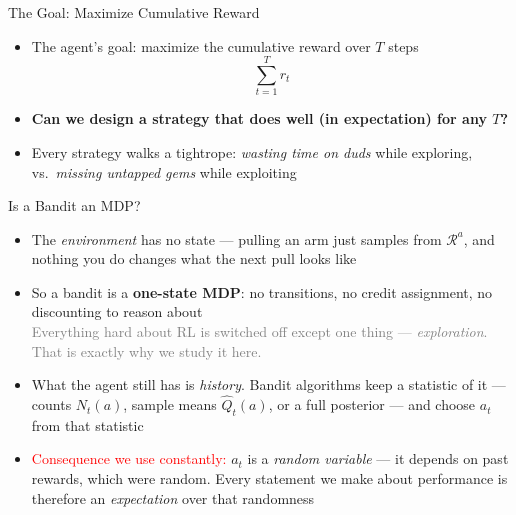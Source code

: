 \begin{frame}{The Goal: Maximize Cumulative Reward}
\begin{itemize}
    \setlength{\itemsep}{0.6em}
    \item The agent's goal: maximize the cumulative reward over $T$ steps
    \[
        \sum_{t=1}^{T} r_t
    \]
    \item \textbf{Can we design a strategy that does well (in expectation) for any $T$?}
    \item Every strategy walks a tightrope: \emph{wasting time on duds} while exploring, vs.\ \emph{missing untapped gems} while exploiting
\end{itemize}
\end{frame}

\begin{frame}{Is a Bandit an MDP?}
\begin{itemize}
    \setlength{\itemsep}{0.55em}
    \item The \emph{environment} has no state --- pulling an arm just samples from $\mathcal{R}^a$, and nothing you do changes what the next pull looks like
    \item So a bandit is a \textbf{one-state MDP}: no transitions, no credit assignment, no discounting to reason about\\
          \textcolor{gray}{Everything hard about RL is switched off except one thing --- \emph{exploration}. That is exactly why we study it here.}
    \item What the agent still has is \emph{history}. Bandit algorithms keep a statistic of it --- counts $N_t(a)$, sample means $\hat{Q}_t(a)$, or a full posterior --- and choose $a_t$ from that statistic
    \item \textcolor{red}{Consequence we use constantly:} $a_t$ is a \emph{random variable} --- it depends on past rewards, which were random. Every statement we make about performance is therefore an \emph{expectation} over that randomness
\end{itemize}
\end{frame}

